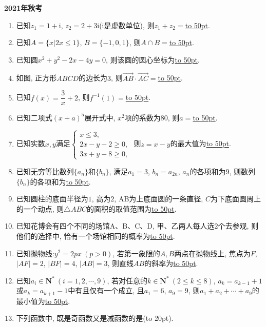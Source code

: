 \documentclass[10pt,a4paper]{article}
\newcommand{\blank}[1]{\underline{\hbox to #1pt{}}}
\newcommand{\bracket}[1]{(\hbox to #1pt{})}
\begin{document}
{\bf 2021年秋考}

\begin{enumerate}[1.]
\item 已知$z_1=1+\mathrm{i}$, $z_2=2+3\mathrm{i}$($\mathrm{i}$是虚数单位), 则$z_1+z_2=$\blank{50}.
\item 已知$A=\{x|2x\le 1\}$, $B=\{-1,0,1\}$, 则$A\cap B=$\blank{50}.
\item 已知圆$x^2+y^2-2x-4y=0$, 则该圆的圆心坐标为\blank{50}.
\item 如图, 正方形$ABCD$的边长为$3$, 则$\overrightarrow{AB}\cdot \overrightarrow{AC}=$\blank{50}.
\begin{center}
\end{center}
\item 已知$f(x)=\dfrac3x+2$, 则$f^{-1}(1)=$\blank{50}.
\item 已知二项式$(x+a)^5$展开式中, $x^2$项的系数为$80$, 则$a=$\blank{50}.
\item 已知实数$x,y$满足$\begin{cases} x\le 3,  \\ 2x-y-2 \ge 0,  \\ 3x+y-8 \ge 0,  \end{cases}$ 则$z=x-y$的最大值为\blank{50}.
\item 已知无穷等比数列$\{a_n\}$和$\{b_n\}$, 满足$a_1=3$, $b_n=a_{2n}$, $a_n$的各项和为$9$, 则数列$\{b_n\}$的各项和为\blank{50}.
\item 已知圆柱的底面半径为$1$, 高为$2$, AB为上底面圆的一条直径, $C$为下底面圆周上的一个动点, 则$\triangle ABC$的面积的取值范围为\blank{50}.
\item 已知花博会有四个不同的场馆A、B、C、D, 甲、乙两人每人选$2$个去参观, 则他们的选择中, 恰有一个场馆相同的概率为\blank{50}.
\item 已知抛物线:$y^2=2px \ (p>0)$, 若第一象限的$A,B$两点在抛物线上, 焦点为$F$, $|AF|=2$, $|BF|=4$, $|AB|=3$, 则直线$AB$的斜率为\blank{50}.
\item 已知$a_i\in \mathbf{N}^* \ (i=1,2,\cdots,9)$, 若对任意的$k\in \mathbf{N}^* \ (2\le k\le 8)$, $a_k=a_{k-1}+1$或$a_k=a_{k+1}-1$中有且仅有一个成立, 且$a_1=6$, $a_9=9$, 则$a_1+a_2+\cdots+a_9$的最小值为\blank{50}.
\item 下列函数中, 既是奇函数又是减函数的是\bracket{20}.

\end{enumerate}
\end{document}
